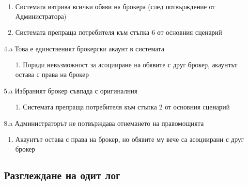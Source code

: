 \documentclass[a4paper]{article}
\begin{document}
\begin{usecase}
{\begin{enumerate}[1.]
                \item Системата изтрива всички обяви на брокера (след потвърждение от Администратора)
                \item Системата препраща потребителя към стъпка 6 от основния сценарий
                \end{enumerate}
        \item[4.a] Това е единственият брокерски акаунт в системата
                \begin{enumerate}[1.]
                \item[1.] Поради невъзможност за асоцииране на обявите с друг брокер, акаунтът остава с права на брокер
                \end{enumerate}
        \item[5.a] Избраният брокер съвпада с оригиналния
                \begin{enumerate}[1.]
                \item[1.] Системата препраща потребителя към стъпка 2 от основния сценарий
                \end{enumerate}
        \item[8.a] Администраторът не потвърждава отнемането на правомощията
                \begin{enumerate}[1.]
                \item Акаунтът остава с права на брокер, но обявите му вече са асоциирани с друг брокер
                \end{enumerate}
}                
\end{usecase}

\subsection{Разглеждане на одит лог} %
\end{document}
